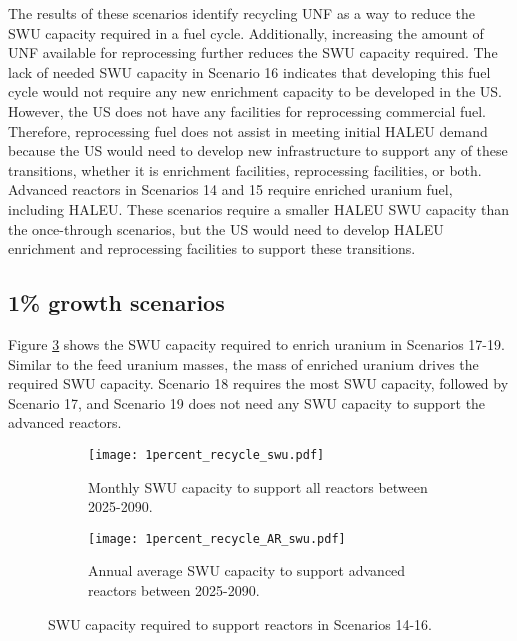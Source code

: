 The results of these scenarios identify recycling \gls{UNF} as a way 
to reduce the \gls{SWU} capacity required in a fuel cycle. Additionally, 
increasing the amount of \gls{UNF} available for reprocessing further 
reduces the \gls{SWU} capacity required. The lack of needed 
\gls{SWU} capacity in Scenario 16 indicates that developing this 
fuel cycle would not require any new enrichment capacity to be developed 
in the US.  However, the US does not have 
any facilities for reprocessing commercial fuel. Therefore, reprocessing
fuel does not assist in meeting initial \gls{HALEU} demand because 
the US would need to develop new infrastructure to support any 
of these transitions, whether it is enrichment facilities, 
reprocessing facilities, or both. Advanced reactors in Scenarios 14 and 15 
require enriched uranium fuel, including \gls{HALEU}. These scenarios 
require a smaller \gls{HALEU} \gls{SWU} capacity than the once-through 
scenarios, but the US would need to develop \gls{HALEU} enrichment 
and reprocessing facilities to support these transitions. 

\subsection{1\% growth scenarios}
Figure \ref{fig:1percent_recycle_swu} shows the \gls{SWU} capacity 
required to enrich uranium in Scenarios 17-19. Similar to the 
feed uranium masses, the mass of enriched uranium drives 
the required \gls{SWU} capacity. Scenario 18 requires the most 
\gls{SWU} capacity, followed by Scenario 17, and Scenario 19 does 
not need any \gls{SWU} capacity to support the advanced reactors. 

\begin{figure}[h!]
    \centering
    \begin{subfigure}[b]{0.45\textwidth}
        \centering
        \texttt{[image: 1percent\_recycle\_swu.pdf]}
        \caption{Monthly SWU capacity to support all reactors between 2025-2090.}
        \label{fig:1percent_recycle_swu_all}
    \end{subfigure}
    \hfill
    \begin{subfigure}[b]{0.45\textwidth}
        \centering
        \texttt{[image: 1percent\_recycle\_AR\_swu.pdf]}
        \caption{Annual average SWU capacity to support 
        advanced reactors between 2025-2090.}
        \label{fig:1percent_recycle_swu_AR}
    \end{subfigure}
       \caption{\gls{SWU} capacity required to support reactors in Scenarios 14-16.}
       \label{fig:1percent_recycle_swu}
\end{figure}

